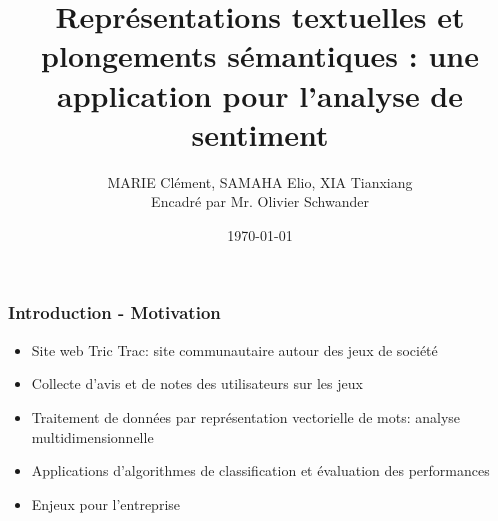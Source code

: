 \documentclass{beamer}
\title{Représentations textuelles et plongements sémantiques : une application pour l'analyse de sentiment}
\author{MARIE Clément, SAMAHA Elio, XIA Tianxiang \\Encadré par Mr. Olivier Schwander}
\date{\today}
\begin{document}

\frame{\titlepage}
\begin{frame}
\frametitle{Introduction - Motivation}


\vspace{2.5cm}

\begin{itemize}
  \item Site web Tric Trac: site communautaire autour des jeux de société
  \item Collecte d'avis et de notes des utilisateurs sur les jeux
  \item Traitement de données par représentation vectorielle de mots: analyse multidimensionnelle 
  \item Applications d'algorithmes de classification et évaluation des performances
  \item Enjeux pour l'entreprise   
\end{itemize}
\end{frame}
\end{document}
